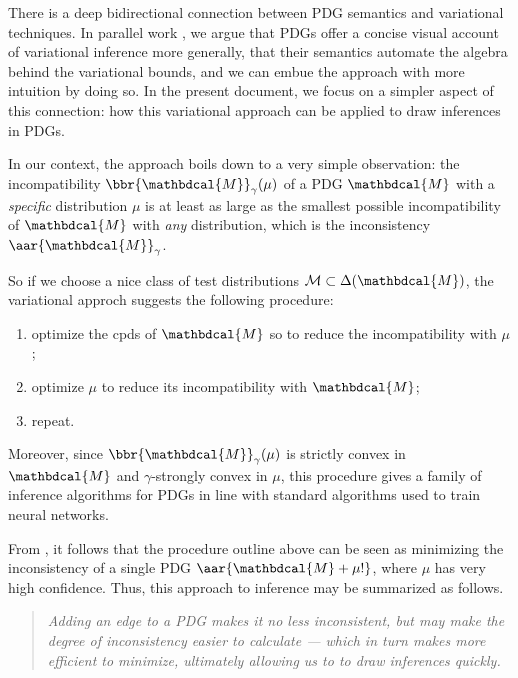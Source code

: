 \documentclass{article}
\theoremstyle{plain}
\theoremstyle{definition}
\theoremstyle{remark}
\newcommand{\dg}[1]{\mathbdcal{#1}}
\newcommand{\bundle}{\mathbin{+}}
\begin{document}
There is a deep bidirectional connection between PDG semantics and variational techniques.
In parallel work \cite{PDG:universal_loss}, we argue that PDGs offer a concise visual account of variational inference more generally, that their semantics automate the algebra behind the variational bounds, and we can embue the approach with more intuition by doing so.
In the present document, we focus on a simpler aspect of this connection: how this variational approach can be applied to draw inferences in PDGs.

In our context, the approach boils down to a very simple observation: the incompatibility $\bbr{\dg M}_\gamma(\mu)$ of a PDG $\dg M$ with a \emph{specific} distribution $\mu$ is at least as large as the smallest possible incompatibility of $\dg M$ with \emph{any} distribution, which is the inconsistency $\aar{\dg M}_\gamma$.

So if we choose a nice class of test distributions $\mathcal M \subset \Delta(\dg M)$, the variational approch suggests the following procedure:
\begin{center}
	\begin{enumerate}[nosep]
		\item optimize the cpds of $\dg M$ so to reduce the incompatibility with $\mu$;
		\item optimize $\mu$ to reduce its incompatibility with $\dg M$;
		\item repeat.
	\end{enumerate}
\end{center}

Moreover, since $\bbr{\dg M}_\gamma(\mu)$ is strictly convex in $\dg M$ and $\gamma$-strongly convex in $\mu$, this procedure gives a family of inference algorithms for PDGs in line with standard algorithms used to train neural networks.

From , it follows that the procedure outline above can be seen as minimizing the inconsistency of a single PDG $\aar{\dg M \bundle \mu! }$, where $\mu$ has very high confidence.
Thus, this approach to inference may be summarized as follows.

\begin{quotation} \it
	\noindent Adding an edge to a PDG makes it no less inconsistent, but may make the degree of inconsistency easier to calculate --- which in turn makes more efficient to minimize, ultimately allowing us to to draw inferences quickly.
\end{quotation}
\end{document}
